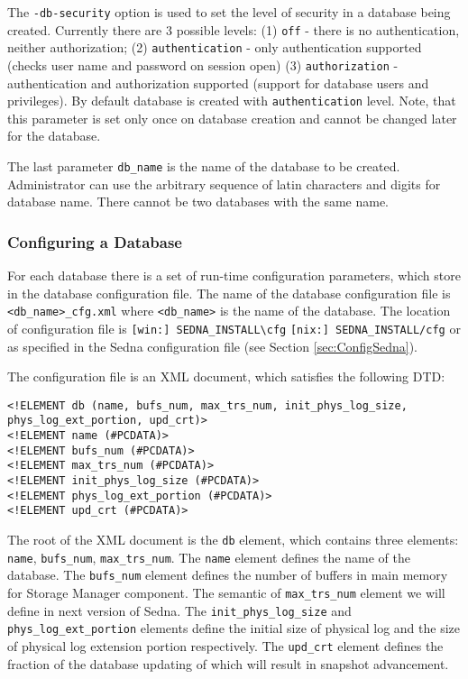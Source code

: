 \documentclass[a4paper,12pt]{article}
\begin{document}
The \verb!-db-security! option is used to set the level of security in a database being created. Currently there are 3 possible levels: (1) \verb!off! - there is no authentication, neither authorization; (2) \verb!authentication! - only authentication supported (checks user name and password on session open) (3) \verb!authorization! - authentication and authorization supported (support for database users and privileges). By default database is created with \verb!authentication! level. Note, that this parameter is set only once on database creation and cannot be changed later for the database.

The last parameter \verb!db_name! is the name of the database to be created. Administrator can use the arbitrary sequence of latin characters and digits for database name. There  cannot be two databases with the same name.

\subsubsection{Configuring a Database}
\label{ConfigDB}
For each database there is a set of run-time configuration parameters, which store in the database configuration file. The name of the database configuration file is \verb!<db_name>_cfg.xml! where \verb!<db_name>! is the name of the database. The location of configuration file is \verb![win:] SEDNA_INSTALL\cfg! \verb![nix:] SEDNA_INSTALL/cfg! or as specified in the Sedna configuration file (see Section \ref{sec:ConfigSedna}). 

The configuration file is an XML document, which satisfies the following DTD: 

\begin{verbatim}
<!ELEMENT db (name, bufs_num, max_trs_num, init_phys_log_size, phys_log_ext_portion, upd_crt)>
<!ELEMENT name (#PCDATA)>
<!ELEMENT bufs_num (#PCDATA)>
<!ELEMENT max_trs_num (#PCDATA)>
<!ELEMENT init_phys_log_size (#PCDATA)>
<!ELEMENT phys_log_ext_portion (#PCDATA)>
<!ELEMENT upd_crt (#PCDATA)>
\end{verbatim}

The root of the XML document is the \verb!db! element, which contains three elements: \verb!name!, \verb!bufs_num!, \verb!max_trs_num!. The \verb!name! element defines the name of the database. The \verb!bufs_num! element defines the number of buffers in main memory for Storage Manager component. The semantic of \verb!max_trs_num! element we will define in next version of Sedna. The \verb!init_phys_log_size! and \verb!phys_log_ext_portion! elements define the initial size of physical log and the size of physical log extension portion respectively. The \verb!upd_crt! element defines the fraction of the database updating of which will result in snapshot advancement.
\end{document}
